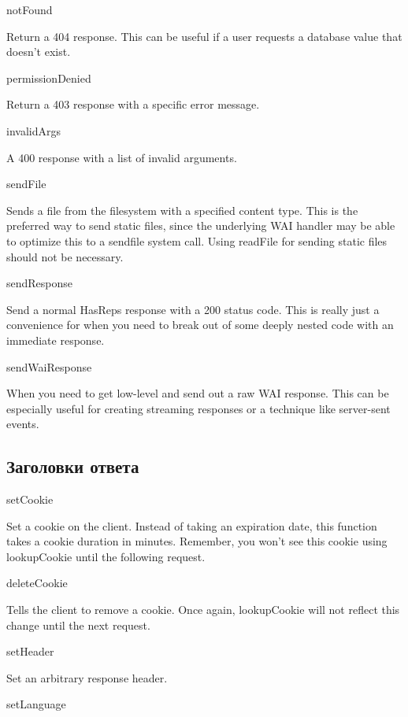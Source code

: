 
notFound

Return a 404 response. This can be useful if a user requests a
database value that doesn't exist.

permissionDenied

Return a 403 response with a specific error message.

invalidArgs

A 400 response with a list of invalid arguments.

sendFile

Sends a file from the filesystem with a specified content type. This
is the preferred way to send static files, since the underlying WAI
handler may be able to optimize this to a sendfile system call. Using
readFile for sending static files should not be necessary.

sendResponse

Send a normal HasReps response with a 200 status code. This is really
just a convenience for when you need to break out of some deeply
nested code with an immediate response.

sendWaiResponse

When you need to get low-level and send out a raw WAI response. This
can be especially useful for creating streaming responses or a
technique like server-sent events.

\subsection{Заголовки ответа}

setCookie

Set a cookie on the client. Instead of taking an expiration date, this
function takes a cookie duration in minutes. Remember, you won't see
this cookie using lookupCookie until the following request.

deleteCookie

Tells the client to remove a cookie. Once again, lookupCookie will not
reflect this change until the next request.

setHeader

Set an arbitrary response header.

setLanguage

